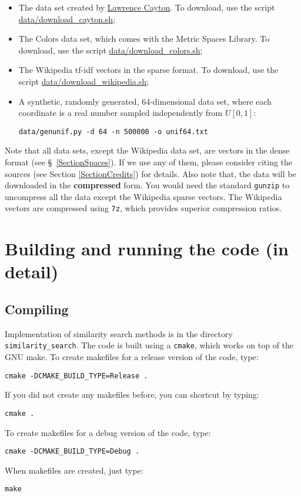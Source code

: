 \documentclass[runningheads,a4paper]{llncs}
\newcommand{\ttt}[1]{\texttt{#1}}
\begin{document}
\begin{itemize} 
\item The data set created by \href{http://lcayton.com}{Lawrence Cayton}. 
To download, use the script 
\href{https://github.com/searchivarius/NonMetricSpaceLib/tree/master/data/download_cayton.sh}{data/download\_cayton.sh};
\item The Colors data set, which comes with the Metric Spaces Library\cite{LibMetricSpace}.
To download, use the script 
\href{https://github.com/searchivarius/NonMetricSpaceLib/tree/master/data/download_colors.sh}{data/download\_colors.sh};
\item The Wikipedia tf-idf vectors in the sparse format.
To download, use the script 
\href{https://github.com/searchivarius/NonMetricSpaceLib/tree/master/data/download_wikipedia.sh}{data/download\_wikipedia.sh};
\item A synthetic, randomly generated, 64-dimensional data set, where each coordinate is a real number sampled independently from $U[0,1]$:  

\ttt{data/genunif.py -d 64 -n 500000 -o unif64.txt}
\end{itemize}

Note that all data sets, except the Wikipedia data set, are vectors in the 
dense format (see \S~\ref{SectionSpaces}).
If we use any of them, please consider citing the sources (see Section \ref{SectionCredits}) for details.
Also note that, the data will be downloaded in the \textbf{compressed} form.
You would need the standard \ttt{gunzip} to uncompress all the data except
the Wikipedia sparse vectors.
The Wikipedia vectors are compressed using \ttt{7z}, which provides 
superior compression ratios.

\section{Building and running the code (in detail)}\label{SectionBuild}
\subsection{Compiling}
Implementation of similarity search methods is in the directory \ttt{similarity\_search}.
The code is built using a \ttt{cmake}, which works on top of the GNU make.
To create makefiles for a release version of the code, type:
\begin{verbatim}
cmake -DCMAKE_BUILD_TYPE=Release .
\end{verbatim}
If you did not create any makefiles before, you can shortcut by typing:
\begin{verbatim}
cmake . 
\end{verbatim}
To create makefiles for a debug version of the code, type:
\begin{verbatim}
cmake -DCMAKE_BUILD_TYPE=Debug .
\end{verbatim}
When makefiles are created, just type:
\begin{verbatim}
make
\end{verbatim}
\end{document}

